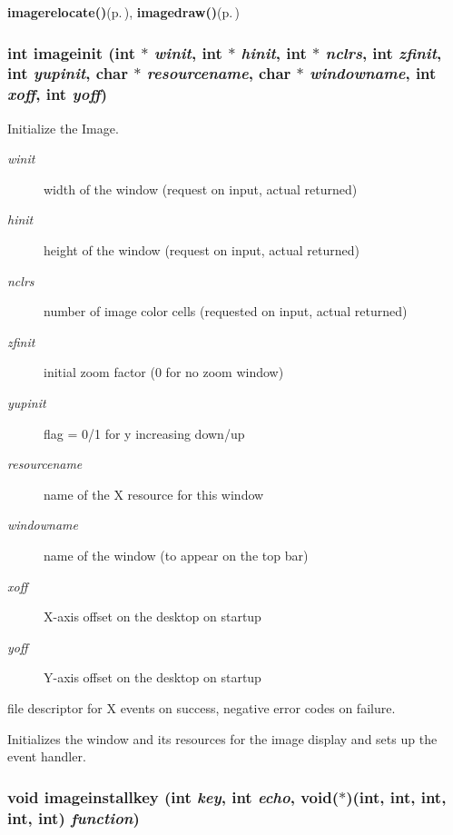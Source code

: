 \begin{Desc}
\item[See also:]{\bf imagerelocate()}{\rm (p.\,\pageref{xtv_8h_a72})}, {\bf imagedraw()}{\rm (p.\,\pageref{xtv_8h_a73})} \end{Desc}
\subsubsection{\setlength{\rightskip}{0pt plus 5cm}int imageinit (int $\ast$ {\em winit}, int $\ast$ {\em hinit}, int $\ast$ {\em nclrs}, int {\em zfinit}, int {\em yupinit}, char $\ast$ {\em resourcename}, char $\ast$ {\em windowname}, int {\em xoff}, int {\em yoff})}\label{xtv_8h_a59}


Initialize the Image. 

\begin{Desc}
\item[Parameters:]
\begin{description}
\item[{\em winit}]width of the window (request on input, actual returned) \item[{\em hinit}]height of the window (request on input, actual returned) \item[{\em nclrs}]number of image color cells (requested on input, actual returned) \item[{\em zfinit}]initial zoom factor (0 for no zoom window) \item[{\em yupinit}]flag = 0/1 for y increasing down/up \item[{\em resourcename}]name of the X resource for this window \item[{\em windowname}]name of the window (to appear on the top bar) \item[{\em xoff}]X-axis offset on the desktop on startup \item[{\em yoff}]Y-axis offset on the desktop on startup\end{description}
\end{Desc}
\begin{Desc}
\item[Returns:]file descriptor for X events on success, negative error codes on failure.\end{Desc}
Initializes the window and its resources for the image display and sets up the event handler. 
\subsubsection{\setlength{\rightskip}{0pt plus 5cm}void imageinstallkey (int {\em key}, int {\em echo}, void($\ast$)(int, int, int, int, int) {\em function})}\label{xtv_8h_a67}


